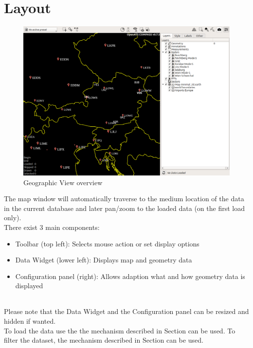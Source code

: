 \section{Layout}

\begin{figure}[H]
    \hspace*{-2.5cm}
    \includegraphics[width=19cm,frame]{figures/geoview_overview.png}
  \caption{Geographic View overview}
  \label{fig:geoview_overview}
\end{figure}

The map window will automatically traverse to the medium location of the data in the current database and later pan/zoom to the loaded data (on the first load only). \\

There exist 3 main components:
\begin{itemize}
 \item Toolbar (top left): Selects mouse action or set display options
 \item Data Widget (lower left): Displays map and geometry data
 \item Configuration panel (right): Allows adaption what and how geometry data is displayed
\end{itemize}
\ \\

Please note that the Data Widget and the Configuration panel can be resized and hidden if wanted. \\

To load the data use the the mechanism described in Section  can be used. To filter the dataset, the mechanism described in Section  can be used. \\

